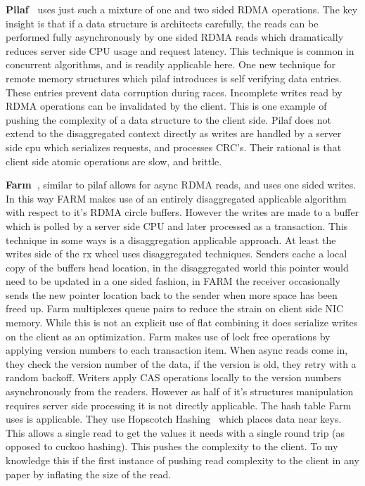 \textbf{Pilaf~\cite{pilaf}} uses just such a mixture of one and two sided RDMA
operations. The key insight is that if a data structure is architects carefully,
the reads can be performed fully asynchronously by one sided RDMA reads which
dramatically reduces server side CPU usage and request latency. This technique
is common in concurrent algorithms, and is readily applicable here. One new
technique for remote memory structures which pilaf introduces is self verifying
data entries. These entries prevent data corruption during races. Incomplete
writes read by RDMA operations can be invalidated by the client. This is one
example of pushing the complexity of a data structure to the client side. Pilaf
does not extend to the disaggregated context directly as writes are handled by a
server side cpu which serializes requests, and processes CRC's. Their rational
is that client side atomic operations are slow, and brittle. 


\textbf{Farm~\cite{farm}}, similar to pilaf allows for async RDMA reads, and
uses one sided writes. In this way FARM makes use of an entirely disaggregated
applicable algorithm with respect to it's RDMA circle buffers. 
However the writes are made to a buffer which is polled by a server side CPU and
later processed as a transaction. This technique in some ways is a
disaggregation applicable approach. At least the writes side of the rx wheel
uses disaggregated techniques. Senders cache a local copy of the buffers head
location, in the disaggregated world this pointer would need to be updated in a
one sided fashion, in FARM the receiver occasionally sends the new pointer
location back to the sender when more space has been freed up.
Farm multiplexes queue pairs to reduce the strain on client side NIC memory.
While this is not an explicit use of flat combining it does serialize writes on
the client as an optimization.
Farm makes use of lock free operations by applying version numbers to each
transaction item. When async reads come in, they check the version number of the
data, if the version is old, they retry with a random backoff. Writers apply CAS
operations locally to the version numbers asynchronously from the readers.
However as half of it's structures manipulation requires server side processing
it is not directly applicable. The hash table Farm uses is applicable. They use
Hopscotch Hashing~\cite{hopscotch} which places data near keys. This allows a
single read to get the values it needs with a single round trip (as opposed to
cuckoo hashing). This pushes the complexity to the client. To my knowledge this
if the first instance of pushing read complexity to the client in any paper by
inflating the size of the read.


